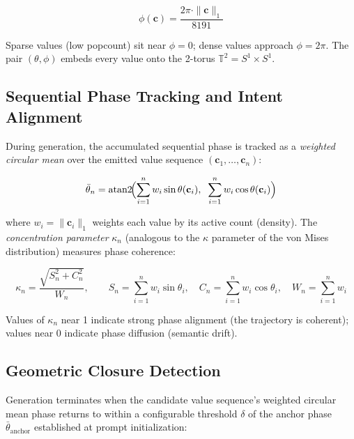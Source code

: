 \begin{equation}
  \phi(\mathbf{c}) = \frac{2\pi \cdot \|\mathbf{c}\|_1}{8191}
  \label{eq:phi_analytical}
\end{equation}

Sparse values (low popcount) sit near $\phi = 0$; dense values approach
$\phi = 2\pi$.  The pair $(\theta, \phi)$ embeds every value onto the
2-torus $\mathbb{T}^2 = S^1 \times S^1$.

\subsection{Sequential Phase Tracking and Intent Alignment}
\label{sec:toroidal_steering}

During generation, the accumulated sequential phase is tracked as a
\emph{weighted circular mean} over the emitted value sequence
$(\mathbf{c}_1, \ldots, \mathbf{c}_n)$:

\begin{equation}
  \bar{\theta}_n = \operatorname{atan2}\!\Bigl(
    \sum_{i=1}^{n} w_i \sin \theta(\mathbf{c}_i),\;\;
    \sum_{i=1}^{n} w_i \cos \theta(\mathbf{c}_i)
  \Bigr)
  \label{eq:seq_phase}
\end{equation}

where $w_i = \|\mathbf{c}_i\|_1$ weights each value by its active count
(density).  The \emph{concentration parameter} $\kappa_n$ (analogous to the
$\kappa$ parameter of the von Mises distribution) measures phase coherence:

\begin{equation}
  \kappa_n = \frac{\sqrt{S_n^2 + C_n^2}}{W_n}, \qquad
  S_n = \sum_{i=1}^{n} w_i \sin \theta_i, \quad
  C_n = \sum_{i=1}^{n} w_i \cos \theta_i, \quad
  W_n = \sum_{i=1}^{n} w_i
  \label{eq:concentration}
\end{equation}

Values of $\kappa_n$ near 1 indicate strong phase alignment (the trajectory
is coherent); values near 0 indicate phase diffusion (semantic drift).

\subsection{Geometric Closure Detection}
\label{sec:geometric_closure}

Generation terminates when the candidate value sequence's weighted circular
mean phase returns to within a configurable threshold $\delta$ of the anchor
phase $\bar{\theta}_{\text{anchor}}$ established at prompt initialization:

